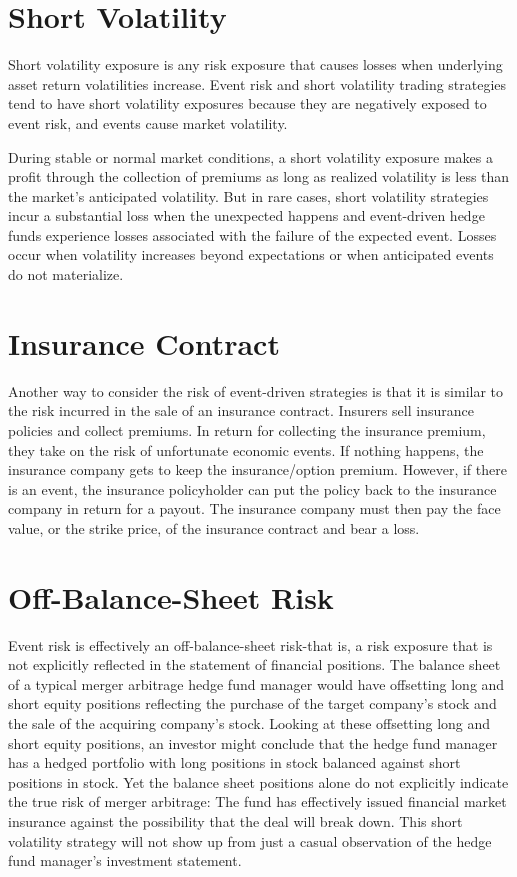 \documentclass[11pt]{article}
\begin{document}
\section*{Short Volatility}
Short volatility exposure is any risk exposure that causes losses when underlying asset return volatilities increase. Event risk and short volatility trading strategies tend to have short volatility exposures because they are negatively exposed to event risk, and events cause market volatility.

During stable or normal market conditions, a short volatility exposure makes a profit through the collection of premiums as long as realized volatility is less than the market's anticipated volatility. But in rare cases, short volatility strategies incur a substantial loss when the unexpected happens and event-driven hedge funds experience losses associated with the failure of the expected event. Losses occur when volatility increases beyond expectations or when anticipated events do not materialize.

\section*{Insurance Contract}
Another way to consider the risk of event-driven strategies is that it is similar to the risk incurred in the sale of an insurance contract. Insurers sell insurance policies and collect premiums. In return for collecting the insurance premium, they take on the risk of unfortunate economic events. If nothing happens, the insurance company gets to keep the insurance/option premium. However, if there is an event, the insurance policyholder can put the policy back to the insurance company in return for a payout. The insurance company must then pay the face value, or the strike price, of the insurance contract and bear a loss.

\section*{Off-Balance-Sheet Risk}
Event risk is effectively an off-balance-sheet risk-that is, a risk exposure that is not explicitly reflected in the statement of financial positions. The balance sheet of a typical merger arbitrage hedge fund manager would have offsetting long and short equity positions reflecting the purchase of the target company's stock and the sale of the acquiring company's stock. Looking at these offsetting long and short equity positions, an investor might conclude that the hedge fund manager has a hedged portfolio with long positions in stock balanced against short positions in stock. Yet the balance sheet positions alone do not explicitly indicate the true risk of merger arbitrage: The fund has effectively issued financial market insurance against the possibility that the deal will break down. This short volatility strategy will not show up from just a casual observation of the hedge fund manager's investment statement.
\end{document}
